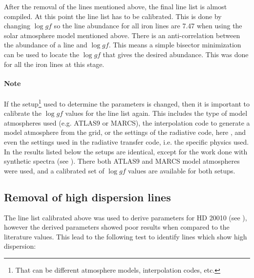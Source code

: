 After the removal of the lines mentioned above, the final line list is almost compiled. At this
point the line list has to be calibrated. This is done by changing $\log \mathit{gf}$ so the line
abundance for all iron lines are 7.47 when using the solar atmosphere model mentioned above. There
is an anti-correlation between the abundance of a line and $\log \mathit{gf}$. This means a simple
bisector minimization can be used to locate the $\log\mathit{gf}$ that gives the desired abundance.
This was done for all the iron lines at this stage.

\paragraph{Note}
If the setup\footnote{That can be different atmosphere models, interpolation codes, etc.} used to
determine the parameters is changed, then it is important to calibrate the $\log \mathit{gf}$ values
for the line list again. This includes the type of model atmospheres used (e.g. ATLAS9 or MARCS),
the interpolation code to generate a model atmosphere from the grid, or the settings of the
radiative code, here , and even the settings used in the radiative transfer code, i.e.
the specific physics used. In the results listed below the setups are identical, except for the work
done with synthetic spectra (see ). There both ATLAS9 and MARCS model
atmospheres were used, and a calibrated set of $\log \mathit{gf}$ values are available for both
setups.


\subsection{Removal of high dispersion lines}

The line list calibrated above was used to derive parameters for HD 20010 (see
), however the derived parameters showed poor results when compared to the
literature values. This lead to the following test to identify lines which show high dispersion:

